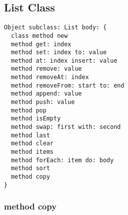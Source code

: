 \subsection{List Class}

\begin{lstlisting}
Object subclass: List body: {
  class method new
  method get: index
  method set: index to: value
  method at: index insert: value
  method remove: value
  method removeAt: index
  method removeFrom: start to: end
  method append: value
  method push: value
  method pop
  method isEmpty
  method swap: first with: second
  method last
  method clear
  method items
  method forEach: item do: body
  method sort
  method copy
}
\end{lstlisting}

\subsubsection{method copy}
